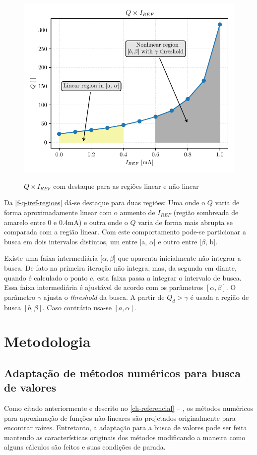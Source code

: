 \begin{figure}[H]
    \centering
    \caption{$Q \times I_{REF}$ com destaque para as regiões linear e não linear}
    \includegraphics[width = .7\textwidth]{fig/q-iref-regions.pdf}
    \label{f-q-iref-regioes}
\end{figure}

Da \autoref{f-q-iref-regioes} dá-se destaque para duas regiões: Uma onde o $Q$ varia de forma aproximadamente linear com o aumento de $I_{REF}$ (região sombreada de amarelo entre 0 e 0.4mA) e outra onde o $Q$ varia de forma mais abrupta se comparada com a região linear. Com este comportamento pode-se particionar a busca em dois intervalos distintos, um entre [a, $\alpha$] e outro entre [$\beta$, b].

Existe uma faixa intermediária [$\alpha, \beta$] que aparenta inicialmente não integrar a busca. De fato na primeira iteração não integra, mas, da segunda em diante, quando é calculado o ponto $c$, esta faixa passa a integrar o intervalo de busca. Essa faixa intermediária é ajustável de acordo com os parâmetros $[\alpha, \beta]$. O parâmetro $\gamma$ ajusta o \textit{threshold} da busca. A partir de $Q_d > \gamma $ é usada a região de busca $[b, \beta]$. Caso contrário usa-se $[a, \alpha]$.



\chapter{Metodologia}

\section{Adaptação de métodos numéricos para busca de valores}\label{sec-adapt-metodos}

Como citado anteriormente e descrito no \autoref{ch-referencial} -- , os métodos numéricos para aproximação de funções não-lineares são projetados originalmente para encontrar raízes. Entretanto, a adaptação para a busca de valores pode ser feita mantendo as características originais dos métodos modificando a maneira como alguns cálculos são feitos e suas condições de parada. 

